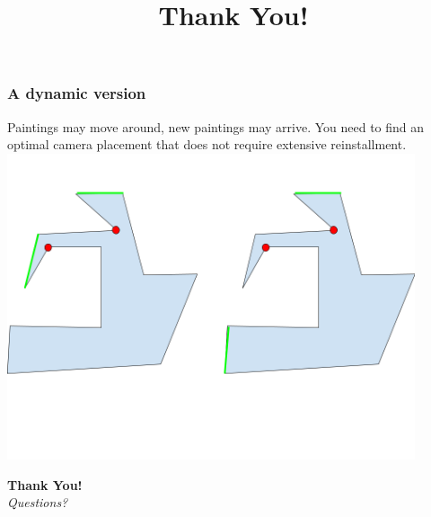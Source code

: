 \documentclass{beamer}
\begin{document}








\begin{frame}
    \frametitle{A dynamic version}
    Paintings may move around, new paintings may arrive. You need to find an optimal camera placement that does not require extensive reinstallment.\\\pause
    \centering
    \includegraphics[width=12cm]{figures/dynamic-gallery.png} %
\end{frame}





\begin{frame}
  \title{Thank You!}
  \begin{center}
      \Huge{\textbf{Thank You!}} \\
      \vspace{1em}
      \Large{\textit{Questions?}} \\
      \vspace{2em}
  \end{center}
\end{frame}
\end{document}

